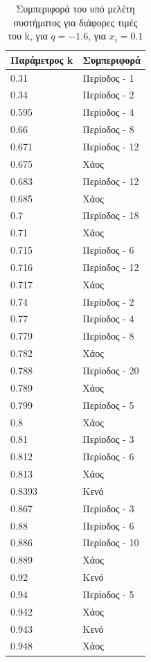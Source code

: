\begin{table}[ht]
	\centering
	\caption{ Συμπεριφορά του υπό μελέτη συστήματος για διάφορες τιμές του k, για $q=-1.6$, για \(x_i=0.1\)}
	\label{tab:abc7}
	\begin{tabular}{l | l }
		Παράμετρος k & Συμπεριφορά \\
		\hline
		0.31 &  Περίοδος -  1 \\
		0.34 &  Περίοδος -  2 \\
		0.595& Περίοδος -  4 \\
		0.66& Περίοδος -  8 \\
		0.671 &  Περίοδος -  12\\
		0.675& Χάος \\
		0.683& Περίοδος -  12 \\
		0.685& Χάος \\
		0.7 &  Περίοδος -  18\\
		0.71&  Χάος \\
		0.715 &  Περίοδος -  6\\
		0.716 &  Περίοδος -  12\\
		0.717 &  Χάος \\
		0.74 & Περίοδος -  2\\
		0.77 &  Περίοδος -  4 \\
		0.779 &  Περίοδος -  8\\
		0.782 & Χάος\\
		0.788 & Περίοδος -  20\\
		0.789 & Χάος\\
		0.799 & Περίοδος -  5\\
		0.8 &Χάος\\
		0.81 & Περίοδος -  3\\
		0.812 & Περίοδος -  6\\
		0.813 & Χάος\\
		0.8393 & Κενό\\
		0.867 & Περίοδος -  3\\
		0.88 & Περίοδος -  6\\
		0.886 & Περίοδος -  10\\
		0.889 & Χάος\\
		0.92 & Κενό\\
		0.94 & Περίοδος -  5\\
		0.942 & Χάος\\
		0.943 & Κενό\\
		0.948 & Χάος\\
	\end{tabular}
\end{table}

